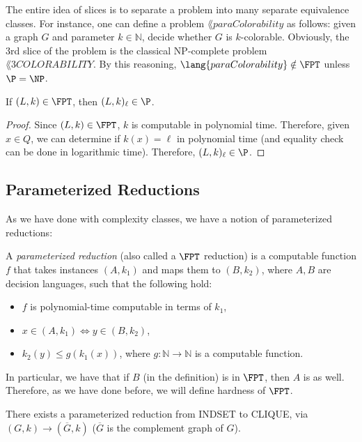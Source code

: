 \newcommand{\paraCOLORABILITY}{\lang{paraColorability}}
The entire idea of slices is to separate a problem into many separate equivalence classes. For instance, one can define a problem $\paraCOLORABILITY$ as follows: given a graph $G$ and parameter $k \in \mathbb{N}$, decide whether $G$ is $k$-colorable. Obviously, the 3rd slice of the problem is the classical NP-complete problem $\lang{3COLORABILITY}$. By this reasoning, $\paraCOLORABILITY \notin \FPT$ unless $\P = \NP$.

\begin{theorem}
If $(L, k) \in \FPT$, then $(L, k)_{\ell} \in \P$.
\end{theorem}

\begin{proof}
Since $(L, k) \in \FPT$, $k$ is computable in polynomial time. Therefore, given $x \in Q$, we can determine if $k(x) = \ell$ in polynomial time (and equality check can be done in logarithmic time). Therefore, $(L, k)_{\ell} \in \P$.
\end{proof}

\subsection{Parameterized Reductions}

As we have done with complexity classes, we have a notion of parameterized reductions:

\begin{definition}
A \emph{parameterized reduction} (also called a $\FPT$ reduction) is a computable function $f$ that takes instances $(A, k_1)$ and maps them to $(B, k_2)$, where $A, B$ are decision languages, such that the following hold:
\begin{itemize}
\item $f$ is polynomial-time computable in terms of $k_1$,
\item $x \in (A, k_1) \Leftrightarrow y \in (B, k_2)$,
\item $k_2(y) \le g(k_1(x))$, where $g: \mathbb{N} \rightarrow \mathbb{N}$ is a computable function.
\end{itemize}
\end{definition}

In particular, we have that if $B$ (in the definition) is in $\FPT$, then $A$ is as well. Therefore, as we have done before, we will define hardness of $\FPT$.

\begin{theorem}
There exists a parameterized reduction from INDSET to CLIQUE, via $(G, k) \rightarrow (\overline{G}, k)$ ($\overline{G}$ is the complement graph of $G$).
\end{theorem}


